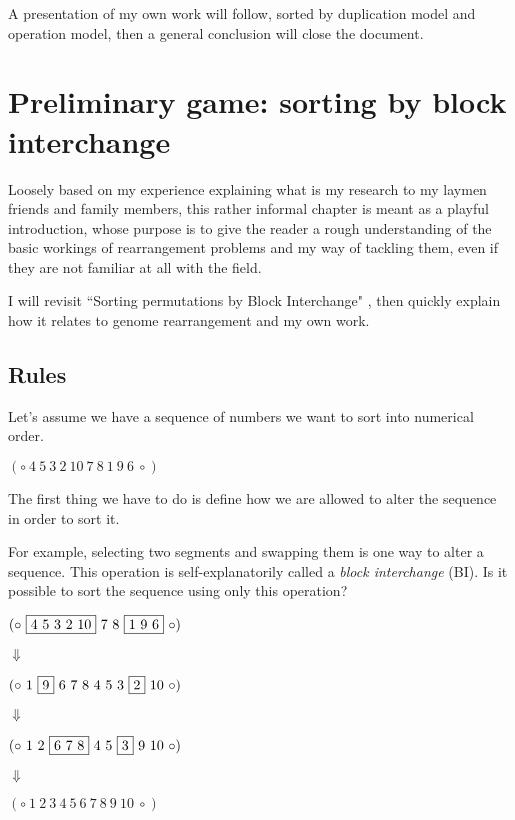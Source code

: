 \documentclass[11pt,final,twoside,nofrench]{thlifl}
\begin{document}
A presentation of my own work will follow, sorted by duplication model and operation model, then a general conclusion will close the document.

\chapter[Preliminary game: sorting by block interchange]{Preliminary game: sorting by block interchange}
\label{chap:rearrangement}

Loosely based on my experience explaining what is my research to my laymen friends and family members, this rather informal chapter is meant as a playful introduction, whose purpose is to give the reader a rough understanding of the basic workings of rearrangement problems and my way of tackling them, even if they are not familiar at all with the field.

I will revisit ``Sorting permutations by Block Interchange" \cite{Christie96}, then quickly explain how it relates to genome rearrangement and my own work.

\section{Rules}

Let's assume we have a sequence of numbers we want to sort into numerical order.
\begin{center}
$(\circ~4~5~3~2~10~7~8~1~9~6~\circ)$
\end{center}

The first thing we have to do is define how we are allowed to alter the sequence in order to sort it.

For example, selecting two segments and swapping them is one way to alter a sequence. This operation is self-explanatorily called a \emph{block interchange} (BI). Is it possible to sort the sequence using only this operation?

\begin{center}
$(\circ~\fbox{4~5~3~2~10}~7~8~\fbox{1~9~6}~\circ)$

$\Downarrow$

$(\circ~1~\fbox{9}~6~7~8~4~5~3~\fbox{2}~10~\circ)$

$\Downarrow$

$(\circ~1~2~\fbox{6~7~8}~4~5~\fbox{3}~9~10~\circ)$

$\Downarrow$

$(\circ~1~2~3~4~5~6~7~8~9~10~\circ)$
\end{center}
\end{document}
